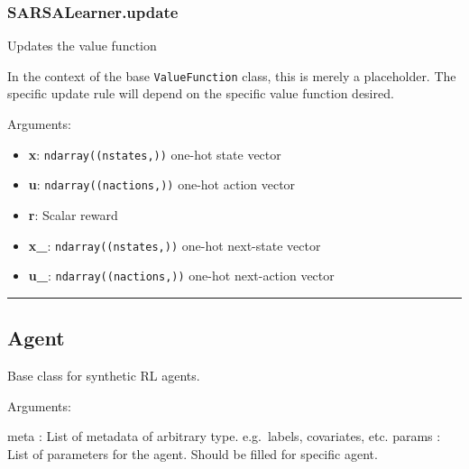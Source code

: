 \subsubsection{SARSALearner.update}\label{sarsalearner.update}

\begin{Shaded}
\begin{Highlighting}[]
\end{Highlighting}
\end{Shaded}

Updates the value function

In the context of the base \texttt{ValueFunction} class, this is merely
a placeholder. The specific update rule will depend on the specific
value function desired.

Arguments:

\begin{itemize}
\tightlist
\item
  \textbf{x}: \texttt{ndarray((nstates,))} one-hot state vector
\item
  \textbf{u}: \texttt{ndarray((nactions,))} one-hot action vector
\item
  \textbf{r}: Scalar reward
\item
  \textbf{x\_}: \texttt{ndarray((nstates,))} one-hot next-state vector
\item
  \textbf{u\_}: \texttt{ndarray((nactions,))} one-hot next-action vector
\end{itemize}

\begin{center}\rule{0.5\linewidth}{\linethickness}\end{center}

\subsection{Agent}\label{agent}

\begin{Shaded}
\begin{Highlighting}[]
\end{Highlighting}
\end{Shaded}

Base class for synthetic RL agents.

Arguments:

meta : List of metadata of arbitrary type. e.g.~labels, covariates, etc.
params : List of parameters for the agent. Should be filled for specific
agent.

